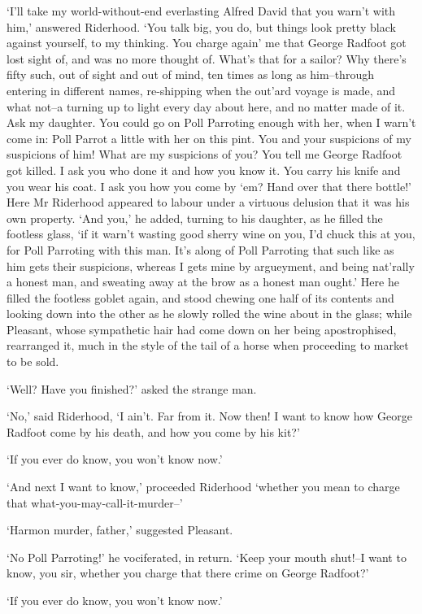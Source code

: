 ‘I’ll take my world-without-end everlasting Alfred David that you warn’t
with him,’ answered Riderhood. ‘You talk big, you do, but things look
pretty black against yourself, to my thinking. You charge again’ me that
George Radfoot got lost sight of, and was no more thought of. What’s
that for a sailor? Why there’s fifty such, out of sight and out of
mind, ten times as long as him--through entering in different names,
re-shipping when the out’ard voyage is made, and what not--a turning
up to light every day about here, and no matter made of it. Ask my
daughter. You could go on Poll Parroting enough with her, when I warn’t
come in: Poll Parrot a little with her on this pint. You and your
suspicions of my suspicions of him! What are my suspicions of you? You
tell me George Radfoot got killed. I ask you who done it and how you
know it. You carry his knife and you wear his coat. I ask you how you
come by ‘em? Hand over that there bottle!’ Here Mr Riderhood appeared
to labour under a virtuous delusion that it was his own property. ‘And
you,’ he added, turning to his daughter, as he filled the footless
glass, ‘if it warn’t wasting good sherry wine on you, I’d chuck this at
you, for Poll Parroting with this man. It’s along of Poll Parroting
that such like as him gets their suspicions, whereas I gets mine by
argueyment, and being nat’rally a honest man, and sweating away at the
brow as a honest man ought.’ Here he filled the footless goblet again,
and stood chewing one half of its contents and looking down into the
other as he slowly rolled the wine about in the glass; while Pleasant,
whose sympathetic hair had come down on her being apostrophised,
rearranged it, much in the style of the tail of a horse when proceeding
to market to be sold.

‘Well? Have you finished?’ asked the strange man.

‘No,’ said Riderhood, ‘I ain’t. Far from it. Now then! I want to know
how George Radfoot come by his death, and how you come by his kit?’

‘If you ever do know, you won’t know now.’

‘And next I want to know,’ proceeded Riderhood ‘whether you mean to
charge that what-you-may-call-it-murder--’

‘Harmon murder, father,’ suggested Pleasant.

‘No Poll Parroting!’ he vociferated, in return. ‘Keep your mouth
shut!--I want to know, you sir, whether you charge that there crime on
George Radfoot?’

‘If you ever do know, you won’t know now.’

